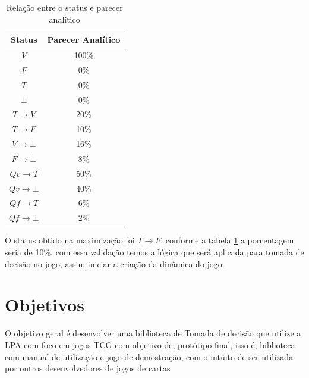 \begin{table}[htb]
	\centering
	\caption{Relação entre o status e parecer analítico}
	\label{tab:analitica}
	\begin{tabular}{cc}
		\hline
		\multicolumn{1}{|c|}{\textbf{Status}} 	& \multicolumn{1}{c|}{\textbf{Parecer Analítico}} \\ \hline
		$V$               						& 100\%                      \\
		$F$               						& 0\%                        \\
		$T$               						& 0\%                        \\
		$\bot$									& 0\%                        \\
		$T \rightarrow V$             			& 20\%                       \\
		$T \rightarrow F$            			& 10\%                       \\
		$V \rightarrow \bot$            		& 16\%                       \\
		$F \rightarrow \bot$            		& 8\%                        \\
		$Qv \rightarrow T$            			& 50\%                       \\
		$Qv \rightarrow \bot$           		& 40\%                       \\
		$Qf \rightarrow T$            			& 6\%                        \\
		$Qf \rightarrow \bot$           		& 2\%                       
	\end{tabular}
\end{table}

O status obtido na maximização foi $T \rightarrow F$, conforme a tabela \ref{tab:analitica} a porcentagem seria de 10\%, com essa validação temos a lógica que será aplicada para tomada de decisão no jogo, assim iniciar a criação da dinâmica do jogo.

\section{Objetivos}

O objetivo geral é desenvolver uma biblioteca de Tomada de decisão que utilize a LPA com foco em jogos TCG com objetivo de, protótipo final, isso é, biblioteca com manual de utilização e jogo de demostração, com o intuito de ser utilizada por outros desenvolvedores de jogos de cartas


